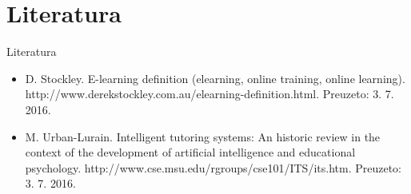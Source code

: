 \documentclass[times, utf8, numeric]{beamer}
\begin{document}
\section{Literatura}
\begin{frame}{Literatura}
\begin{itemize}
	\item D. Stockley. E-learning definition (elearning, online training, online learning).
	http://www.derekstockley.com.au/elearning-definition.html. Preuzeto: 3. 7. 2016.
	\item
	M. Urban-Lurain. Intelligent tutoring systems: An historic review in the context
	of the development of artificial intelligence and educational psychology.
	http://www.cse.msu.edu/rgroups/cse101/ITS/its.htm. Preuzeto: 3. 7. 2016.
\end{itemize}
\end{frame}
\end{document}
